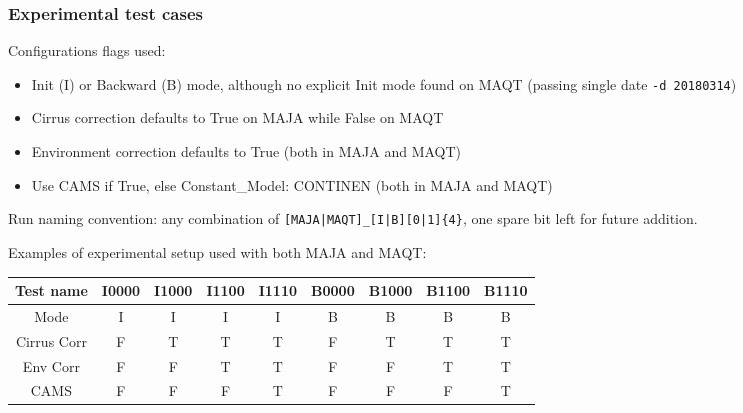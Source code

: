 \documentclass[8pt]{beamer}
\begin{document}
\begin{frame}
\frametitle{Experimental test cases}
	
	Configurations flags used:
	
	\begin{itemize}
		\item Init (I) or Backward (B) mode, although no explicit Init mode found on MAQT (passing single date \texttt{-d 20180314})
		\item Cirrus correction defaults to True on MAJA while False on MAQT
		\item Environment correction defaults to True (both in MAJA and MAQT)
		\item Use CAMS if True, else Constant\_Model: CONTINEN (both in MAJA and MAQT)
	\end{itemize}
	
	Run naming convention: any combination of \texttt{[MAJA|MAQT]\_[I|B][0|1]\{4\}}, one spare bit left for future addition.	
	
	\begin{center}
		Examples of experimental setup used with both MAJA and MAQT:
		\begin{tabular}{|c|c|c|c|c|c|c|c|c|}
			\hline 
			Test name   & I0000 & I1000 & I1100 & I1110 & B0000 & B1000 & B1100 & B1110\\ 
			\hline 
			Mode        & I     & I     & I     & I     & B     & B     & B     & B   \\ 
			\hline 
			Cirrus Corr & F     & T     & T     & T     & F     & T     & T     & T   \\ 
			\hline 
			Env Corr    & F     & F     & T     & T     & F     & F     & T     & T   \\ 
			\hline 
			CAMS        & F     & F     & F     & T     & F     & F     & F     & T   \\ 
			\hline 
		\end{tabular} 
	\end{center}
	
	
\end{frame}
\end{document}

